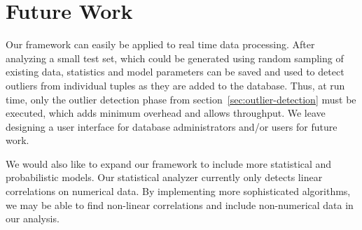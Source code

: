 \section{Future Work}
\label{sec:future-work}

Our framework can easily be applied to real time data processing.
After analyzing a small test set, which could be generated using random sampling of existing data, statistics and model parameters can be saved and used to detect outliers from individual tuples as they are added to the database.
Thus, at run time, only the outlier detection phase from section~\ref{sec:outlier-detection} must be executed, which adds minimum overhead and allows throughput.
We leave designing a user interface for database administrators and/or users for future work.

We would also like to expand our framework to include more statistical and probabilistic models. Our statistical analyzer currently only detects linear correlations on numerical data.
By implementing more sophisticated algorithms, we may be able to find non-linear correlations and include non-numerical data in our analysis.